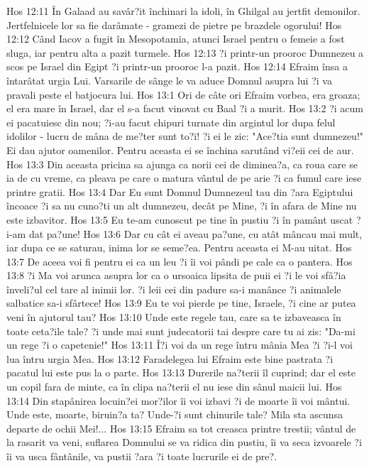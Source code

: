 Hos 12:11  În Galaad au savâr?it închinari la idoli, în Ghilgal au jertfit demonilor. Jertfelnicele lor sa fie darâmate - gramezi de pietre pe brazdele ogorului!
Hos 12:12  Când Iacov a fugit în Mesopotamia, atunci Israel pentru o femeie a fost sluga, iar pentru alta a pazit turmele.
Hos 12:13  ?i printr-un prooroc Dumnezeu a scos pe Israel din Egipt ?i printr-un prooroc l-a pazit.
Hos 12:14  Efraim însa a întarâtat urgia Lui. Varsarile de sânge le va aduce Domnul asupra lui ?i va pravali peste el batjocura lui.
Hos 13:1  Ori de câte ori Efraim vorbea, era groaza; el era mare în Israel, dar el s-a facut vinovat cu Baal ?i a murit.
Hos 13:2  ?i acum ei pacatuiesc din nou; ?i-au facut chipuri turnate din argintul lor dupa felul idolilor - lucru de mâna de me?ter sunt to?i! ?i ei le zic: "Ace?tia sunt dumnezeu!" Ei dau ajutor oamenilor. Pentru aceasta ei se închina sarutând vi?eii cei de aur.
Hos 13:3  Din aceasta pricina sa ajunga ca norii cei de diminea?a, ca roua care se ia de cu vreme, ca pleava pe care o matura vântul de pe arie ?i ca fumul care iese printre gratii.
Hos 13:4  Dar Eu sunt Domnul Dumnezeul tau din ?ara Egiptului încoace ?i sa nu cuno?ti un alt dumnezeu, decât pe Mine, ?i în afara de Mine nu este izbavitor.
Hos 13:5  Eu te-am cunoscut pe tine în pustiu ?i în pamânt uscat ?i-am dat pa?une!
Hos 13:6  Dar cu cât ei aveau pa?une, cu atât mâncau mai mult, iar dupa ce se saturau, inima lor se seme?ea. Pentru aceasta ei M-au uitat.
Hos 13:7  De aceea voi fi pentru ei ca un leu ?i îi voi pândi pe cale ca o pantera.
Hos 13:8  ?i Ma voi arunca asupra lor ca o ursoaica lipsita de puii ei ?i le voi sfâ?ia înveli?ul cel tare al inimii lor. ?i leii cei din padure sa-i manânce ?i animalele salbatice sa-i sfârtece!
Hos 13:9  Eu te voi pierde pe tine, Israele, ?i cine ar putea veni în ajutorul tau?
Hos 13:10  Unde este regele tau, care sa te izbaveasca în toate ceta?ile tale? ?i unde mai sunt judecatorii tai despre care tu ai zis: "Da-mi un rege ?i o capetenie!"
Hos 13:11  Î?i voi da un rege întru mânia Mea ?i ?i-l voi lua întru urgia Mea.
Hos 13:12  Faradelegea lui Efraim este bine pastrata ?i pacatul lui este pus la o parte.
Hos 13:13  Durerile na?terii îl cuprind; dar el este un copil fara de minte, ca în clipa na?terii el nu iese din sânul maicii lui.
Hos 13:14  Din stapânirea locuin?ei mor?ilor îi voi izbavi ?i de moarte îi voi mântui. Unde este, moarte, biruin?a ta? Unde-?i sunt chinurile tale? Mila sta ascunsa departe de ochii Mei!...
Hos 13:15  Efraim sa tot creasca printre trestii; vântul de la rasarit va veni, suflarea Domnului se va ridica din pustiu, îi va seca izvoarele ?i îi va usca fântânile, va pustii ?ara ?i toate lucrurile ei de pre?.
